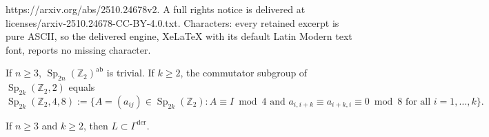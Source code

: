 \documentclass[10pt,a4paper]{amsart}
\DeclareMathOperator{\Sp}{Sp}
\newcommand{\Z}{\mathbb{Z}}
\begin{document}
https://arxiv.org/abs/2510.24678v2. A full rights notice is delivered at licenses/arxiv-2510.24678-CC-BY-4.0.txt. Characters: every retained excerpt is pure ASCII, so the delivered engine, XeLaTeX with its default Latin Modern text font, reports no missing character.
\begin{lemma}\label{lemma: abelianization level subgroups symplectic group}
    If $n\geq 3$, $\Sp_{2n}(\Z_2)^{\mathrm{ab}}$ is trivial.
    If $k\geq 2$, the commutator subgroup of $\Sp_{2k}(\Z_2,2)$ equals 
    \[
    \Sp_{2k}(\Z_2,4,8):=
    \{ A = (a_{ij}) \in \Sp_{2k}(\Z_2)\colon A\equiv I \bmod 4 \text{  and }a_{i,i+k}\equiv a_{i+k,i}\equiv 0 \bmod{8} \text{ for all }i=1,\dots, k\}.
    \]
\end{lemma}

\begin{lemma}\label{lemma: block diagonal elements are in the commutator subgroup}
    If $n\geq 3$ and $k\geq 2$, then $L\subset \Gamma^{\mathrm{der}}$.
\end{lemma}
\end{document}
